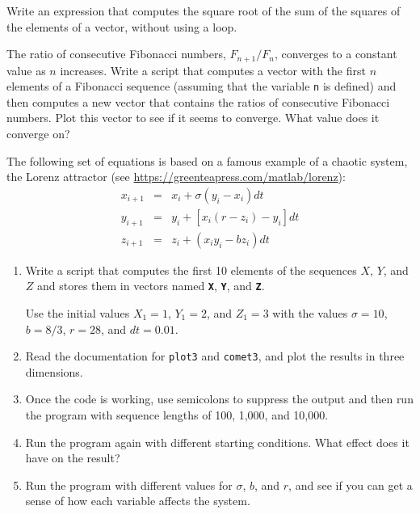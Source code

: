\begin{ex}
Write an expression that computes the square root of the sum of the squares of the elements of a vector, without using a loop.
\end{ex}



\begin{ex}
\label{fibratio}

The ratio of consecutive Fibonacci numbers, $F_{n+1}/F_{n}$, converges
to a constant value as $n$ increases.  Write a script that computes
a vector with the first $n$ elements of a Fibonacci sequence (assuming
that the variable \lstinline{n} is defined) and then computes a new
vector that contains the ratios of consecutive Fibonacci numbers.
Plot this vector to see if it seems to converge.  What value does
it converge on?


\end{ex}


\begin{ex}
  The following set of equations is based on a famous example of a chaotic system, the Lorenz attractor (see \url{https://greenteapress.com/matlab/lorenz}):
%
\begin{eqnarray*}
x_{i+1} &=& x_i + \sigma \left( y_i - x_i \right) dt  \\
y_{i+1} &=& y_i + \left[ x_i (r - z_i) - y_i \right] dt   \\
z_{i+1} &=& z_i + \left( x_i y_i - b z_i \right) dt
\end{eqnarray*}
%
\begin{enumerate}

\item Write a script that computes the first 10 elements of the sequences
$X$, $Y$, and $Z$ and stores them in vectors named \textbf{\lstinline{X}}, \textbf{\lstinline{Y}},
and \textbf{\lstinline{Z}}.

Use the initial values $X_1 = 1$, $Y_1 = 2$, and $Z_1 = 3$ with the values
$\sigma = 10$, $b = 8/3$, $r = 28$, and $dt = 0.01$.

\item Read the documentation for \lstinline{plot3} and \lstinline{comet3}, and
plot the results in three dimensions.

\item Once the code is working, use semicolons to suppress the output
and then run the program with sequence lengths of 100, 1,000, and 10,000.

\item Run the program again with different starting conditions.
What effect does it have on the result?

\item Run the program with different values for $\sigma$, $b$, and $r$,
and see if you can get a sense of how each variable affects the
system.

\end{enumerate}


\end{ex}


